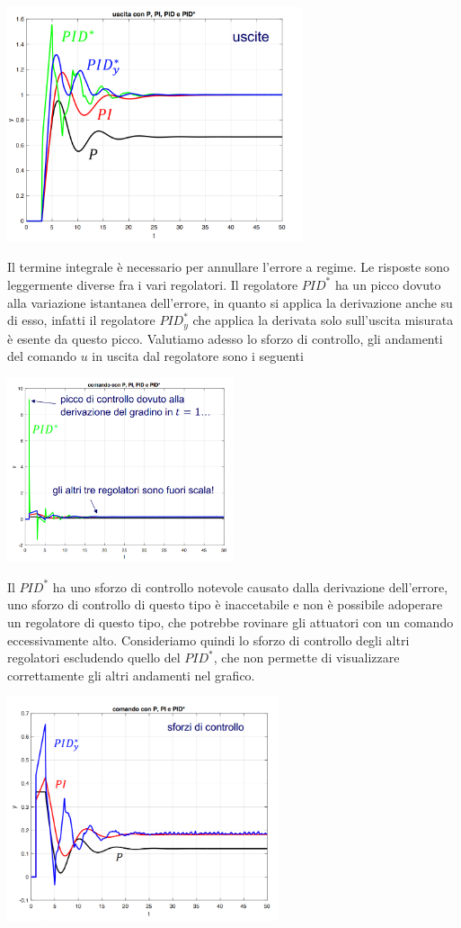 \documentclass[10pt, letterpaper]{report}
\begin{document}
\begin{center}
    \includegraphics[width=0.65\textwidth]{images/ZN10.png}
\end{center}
Il termine integrale è necessario per annullare l'errore a regime. Le risposte sono leggermente diverse fra i vari regolatori. Il regolatore $PID^*$ ha un picco dovuto alla variazione istantanea dell'errore, in quanto si applica la derivazione anche su di esso, infatti il regolatore $PID_y^*$ che applica la derivata solo sull'uscita misurata è esente da questo picco.\acc 
Valutiamo adesso lo sforzo di controllo, gli andamenti del comando $u$ in uscita dal regolatore sono i seguenti 
\begin{center}
    \includegraphics[width=0.5\textwidth]{images/ZN11.png}
\end{center}
Il $PID^*$ ha uno sforzo di controllo notevole causato dalla derivazione dell'errore, uno sforzo di controllo di questo tipo è inaccetabile e non è possibile adoperare un regolatore di questo tipo, che potrebbe rovinare gli attuatori con un comando eccessivamente alto. Consideriamo quindi lo sforzo di controllo degli altri regolatori escludendo quello del $PID^*$, che non permette di visualizzare correttamente gli altri andamenti nel grafico.
\begin{center}
    \includegraphics[width=0.6\textwidth]{images/ZN12.png}
\end{center}
\end{document}
